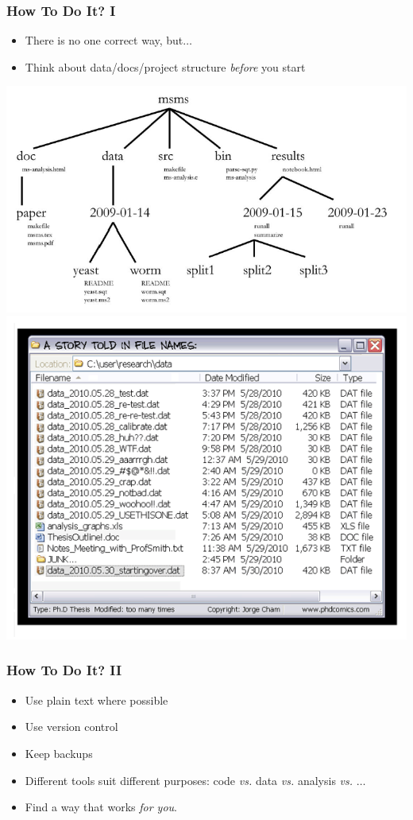 \documentclass[table]{beamer}
\begin{document}
   \begin{frame}
     \frametitle{How To Do It? I}
     \begin{itemize}
	   \item There is no one correct way, but$\ldots$
	   \item Think about data/docs/project structure \textit{before} you start
    \end{itemize}
    \begin{center}
      \includegraphics[width=.5\textwidth]{images/project_structure}
      \includegraphics[width=.5\textwidth]{images/phd052810s}
    \end{center}
   \end{frame}

   \begin{frame}
     \frametitle{How To Do It? II}
     \begin{itemize}
	   \item Use plain text where possible
	   \item Use version control
	   \item Keep backups
	   \item Different tools suit different purposes: code \textit{vs.} data \textit{vs.} analysis \textit{vs.} $\ldots$
	   \item Find a way that works \emph{for you}.
	\end{itemize}
   \end{frame}
\end{document}
